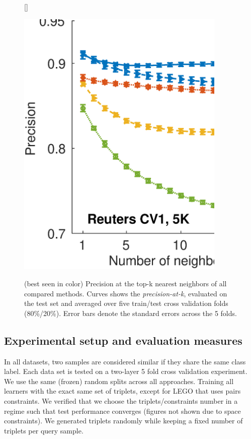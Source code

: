 \documentclass[twoside,11pt]{article}
\begin{document}
\begin{figure}[ht, width=15cm]
\captionsetup{font=small}
[\FBwidth]
{\caption{(best seen in color) Precision at the top-k nearest neighbors of all compared methods. Curves shows the  \textit{precision-at-k}, evaluated on the test set and averaged over five train/test cross validation folds (80\%/20\%). Error bars denote the standard errors across the 5 folds.}\label{precFig}}
{\includegraphics[width=10cm]{Precision_at_K_all_datasets}}
\vskip -0pt
\end{figure}

\vspace{-6pt}
\subsection{Experimental setup and evaluation measures}\vskip -5pt
In all datasets, two samples are considered similar if they share the same class label. Each data set is tested on a two-layer 5 fold cross validation experiment. We use the same (frozen) random splits across all approaches. Training all learners with the exact same set of triplets, except for LEGO that uses pairs constraints. We verified that we choose the triplets/constraints number in a regime such that test performance converges (figures not shown due to space constraints). We generated triplets randomly while keeping a fixed number of triplets per query sample.
\end{document}
